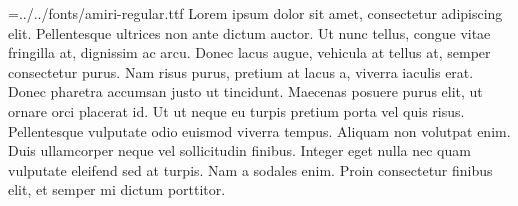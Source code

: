 
\pagewidth=210mm
\pageheight=297mm
\hsize=210mm
\hsize=190mm
\hoffset=10mm
\voffset=10mm
\nopagenumbers
\parindent=0mm
\font\amiri={../../fonts/amiri-regular.ttf}
\amiri
Lorem ipsum dolor sit amet, consectetur adipiscing elit. Pellentesque ultrices non ante dictum auctor. Ut nunc tellus, congue vitae fringilla at, dignissim ac arcu. Donec lacus augue, vehicula at tellus at, semper consectetur purus. Nam risus purus, pretium at lacus a, viverra iaculis erat. Donec pharetra accumsan justo ut tincidunt. Maecenas posuere purus elit, ut ornare orci placerat id. Ut ut neque eu turpis pretium porta vel quis risus. Pellentesque vulputate odio euismod viverra tempus. Aliquam non volutpat enim. Duis ullamcorper neque vel sollicitudin finibus. Integer eget nulla nec quam vulputate eleifend sed at turpis. Nam a sodales enim. Proin consectetur finibus elit, et semper mi dictum porttitor.
\bye
